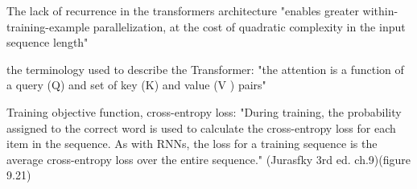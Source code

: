 The lack of recurrence in the transformers architecture "enables greater within-training-example parallelization, at the cost of quadratic complexity in the input sequence length" \citep{liu2018generating} 


the terminology used to describe the Transformer: "the attention is a function of a query (Q) and set of key (K) and value (V ) pairs" \citep{liu2018generating} 












Training objective function, cross-entropy loss:
 "During training, the probability assigned to the correct word is used to calculate the cross-entropy loss for each item in the sequence. As with RNNs, the loss for a training sequence is the average cross-entropy loss over the entire sequence." (Jurasfky 3rd ed. ch.9)(figure 9.21)

